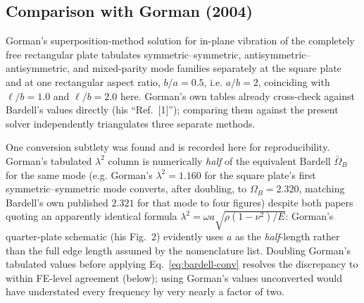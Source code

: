 \documentclass[11pt]{article}
\begin{document}
\subsection{Comparison with Gorman (2004)}\label{sec:gorman}
Gorman's superposition-method solution for in-plane vibration of the
completely free rectangular plate \cite{gorman2004} tabulates
symmetric--symmetric, antisymmetric--antisymmetric, and mixed-parity mode
families separately at the square plate and at one rectangular aspect
ratio, $b/a=0.5$, i.e. $a/b=2$, coinciding with $\ell/b=1.0$ and $\ell/b=2.0$
here. Gorman's own tables already cross-check against Bardell's values
directly (his ``Ref.~[1]''); comparing them against the present solver
independently triangulates three separate methods.

One conversion subtlety was found and is recorded here for reproducibility.
Gorman's tabulated $\lambda^2$ column is numerically \emph{half} of the
equivalent Bardell $\bar\Omega_B$ for the same mode (e.g. Gorman's
$\lambda^2=1.160$ for the square plate's first symmetric--symmetric mode
converts, after doubling, to $\Omega_B=2.320$, matching Bardell's own
published $2.321$ for that mode to four figures) despite both papers
quoting an apparently identical formula $\lambda^2=\omega a\sqrt{\rho(1-\nu^2)/E}$:
Gorman's quarter-plate schematic (his Fig.~2) evidently uses $a$ as the
\emph{half}-length rather than the full edge length assumed by the
nomenclature list. Doubling Gorman's tabulated values before applying
Eq.~\eqref{eq:bardell-conv} resolves the discrepancy to within FE-level agreement (below);
using Gorman's values unconverted would have understated every frequency
by very nearly a factor of two.
\end{document}
